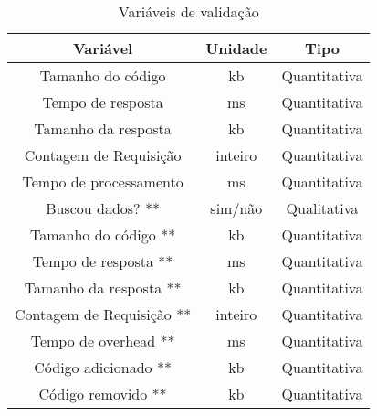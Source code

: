 \begin{table}[H]
  \centering
  \begin{tabular}{|c|c|c|}
    \hline
    Variável & Unidade & Tipo \\
    \hline
    Tamanho do código & kb & Quantitativa \\
    \hline
    Tempo de resposta & ms & Quantitativa \\
    \hline
    Tamanho da resposta & kb & Quantitativa \\
    \hline
    Contagem de Requisição & inteiro & Quantitativa \\
    \hline
    Tempo de processamento & ms & Quantitativa \\
    \hline
    Buscou dados? ** & sim/não & Qualitativa \\
    \hline
    Tamanho do código ** & kb & Quantitativa \\
    \hline
    Tempo de resposta ** & ms & Quantitativa \\
    \hline
    Tamanho da resposta ** & kb & Quantitativa \\
    \hline
    Contagem de Requisição ** & inteiro & Quantitativa \\
    \hline
    Tempo de overhead ** & ms & Quantitativa \\
    \hline
  	Código adicionado ** & kb & Quantitativa \\
    \hline
  	Código removido ** & kb & Quantitativa \\
    \hline
  \end{tabular}
  \caption{Variáveis de validação}
\end{table}

 
 
 
 
 
 

 
